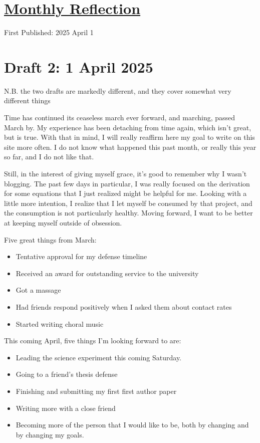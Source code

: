 \documentclass[12pt]{article}[titlepage]
\renewcommand{\,}{\textsuperscript{,}}
\begin{document}
\doublespacing
\section{\href{reflection-march-25.html}{Monthly Reflection}}
First Published: 2025 April 1

\section{Draft 2: 1 April 2025}

N.B. the two drafts are markedly different, and they cover somewhat very different things

Time has continued its ceaseless march ever forward, and marching, passed March by.  
My experience has been detaching from time again, which isn't great, but is true.  
With that in mind, I will really reaffirm here my goal to write on this site more often.  
I do not know what happened this past month, or really this year so far, and I do not like that.

Still, in the interest of giving myself grace, it's good to remember why I wasn't blogging.  
The past few days in particular, I was really focused on the derivation for some equations that I just realized might be helpful for me.  
Looking with a little more intention, I realize that I let myself be consumed by that project, and the consumption is not particularly healthy.  
Moving forward, I want to be better at keeping myself outside of obsession.

Five great things from March:  
\begin{itemize}  
\item Tentative approval for my defense timeline  
\item Received an award for outstanding service to the university  
\item Got a massage  
\item Had friends respond positively when I asked them about contact rates  
\item Started writing choral music  
\end{itemize}

This coming April, five things I'm looking forward to are:  
\begin{itemize}  
\item Leading the science experiment this coming Saturday.  
\item Going to a friend's thesis defense  
\item Finishing and submitting my first first author paper  
\item Writing more with a close friend  
\item Becoming more of the person that I would like to be, both by changing and by changing my goals.  
\end{itemize}
\end{document}
